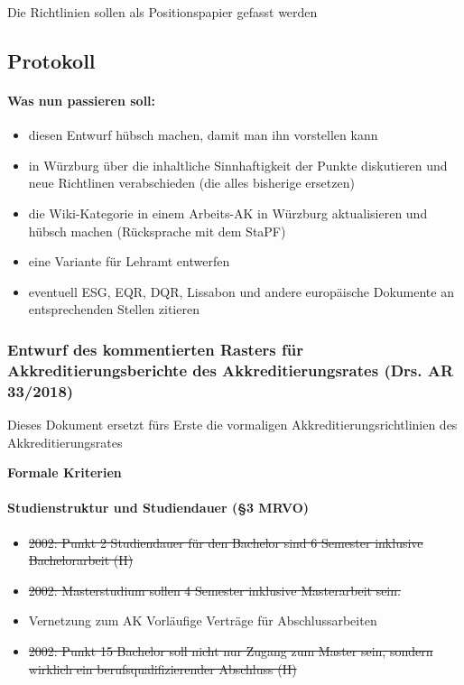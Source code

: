Die Richtlinien sollen als Positionspapier gefasst werden

  \subsection*{Protokoll}
    \paragraph{Was nun passieren soll:}
      \begin{itemize}
        \item diesen Entwurf hübsch machen, damit man ihn vorstellen kann
        \item in Würzburg über die inhaltliche Sinnhaftigkeit der Punkte diskutieren und neue Richtlinen verabschieden (die alles bisherige ersetzen)
        \item die Wiki-Kategorie in einem Arbeits-AK in Würzburg aktualisieren und hübsch machen (Rücksprache mit dem StaPF)
        \item eine Variante für Lehramt entwerfen
        \item eventuell ESG, EQR, DQR, Lissabon und andere europäische Dokumente an entsprechenden Stellen zitieren
      \end{itemize}

    \subsubsection*{Entwurf des kommentierten Rasters für Akkreditierungsberichte des Akkreditierungsrates (Drs. AR 33/2018)}
      Dieses Dokument ersetzt fürs Erste die vormaligen Akkreditierungsrichtlinien des Akkreditierungsrates

    \textbf{Formale Kriterien}
      \paragraph{Studienstruktur und Studiendauer (§3 MRVO)}
        \begin{itemize}
          \item \sout{2002: Punkt 2 Studiendauer für den Bachelor sind 6 Semester inklusive Bachelorarbeit (H)} %
          \item \sout{2002: Masterstudium sollen 4 Semester inklusive Masterarbeit sein.}
          \item Vernetzung zum AK Vorläufige Verträge für Abschlussarbeiten
          \item \sout{2002: Punkt 15 Bachelor soll nicht nur Zugang zum Master sein, sondern wirklich ein berufsqualifizierender Abschluss (H)}
        \end{itemize}

